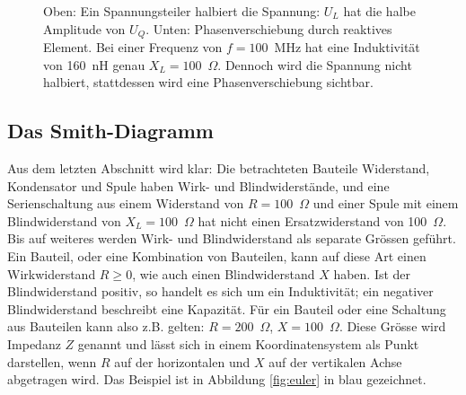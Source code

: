 \documentclass[twoside,a4paper,11pt,halfparskip,DIV=11,notitlepage]{scrartcl}
\begin{document}
\begin{figure}
    \hfill
    \caption{Oben: Ein Spannungsteiler halbiert die Spannung: $U_L$ hat die
    halbe Amplitude von $U_Q$. Unten: Phasenverschiebung durch reaktives Element. Bei
einer Frequenz von $f=100$~MHz hat eine Induktivität von 160~nH genau
$X_L=100$~$\Omega$. Dennoch wird die Spannung nicht halbiert, stattdessen wird eine Phasenverschiebung sichtbar.}
    \label{fig:phasenverschiebung}
\end{figure}

\subsection{Das Smith-Diagramm}
Aus dem letzten Abschnitt wird klar: Die betrachteten Bauteile Widerstand, Kondensator und Spule haben Wirk- und
Blindwiderstände, und eine Serienschaltung aus einem Widerstand von
$R=100$~$\Omega$ und einer Spule mit einem Blindwiderstand von $X_L=100$~$\Omega$ hat nicht einen Ersatzwiderstand
von 100~$\Omega$. Bis auf weiteres werden Wirk- und Blindwiderstand als separate Grössen geführt. Ein Bauteil,
oder eine Kombination von Bauteilen, kann auf diese Art einen Wirkwiderstand
$R\ge0$, wie auch einen Blindwiderstand $X$ haben. Ist der Blindwiderstand positiv, so handelt es sich um ein
Induktivität; ein negativer Blindwiderstand beschreibt eine Kapazität. Für ein Bauteil oder eine Schaltung
aus Bauteilen kann also z.B. gelten: $R=200$~$\Omega$, $X=100$~$\Omega$. Diese Grösse wird Impedanz $Z$ genannt
und lässt sich in einem Koordinatensystem als Punkt darstellen, wenn $R$ auf
der horizontalen und $X$ auf der vertikalen Achse abgetragen wird. Das Beispiel
ist in Abbildung \ref{fig:euler} in  blau gezeichnet. 
\end{document}
